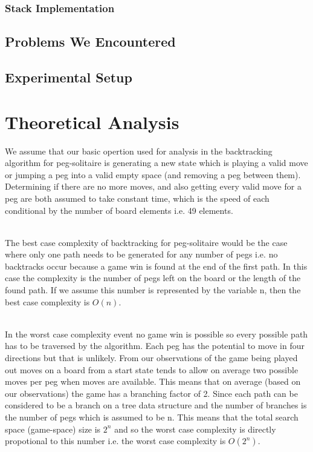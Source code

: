 \documentclass[a4paper]{article}
\begin{document}
\subsubsection{Stack Implementation}


\subsection{Problems We Encountered}

\subsection{Experimental Setup}


\section{Theoretical Analysis}
We assume that our basic opertion used for analysis in the backtracking algorithm for peg-solitaire is generating a new state which is playing a valid move or jumping a peg into a valid empty space (and removing a peg between them). Determining if there are no more moves, and also getting every valid move for a peg are both assumed to take constant time, which is the speed of each conditional by the number of board elements i.e. 49 elements.\\\

\noindent The best case complexity of backtracking for peg-solitaire would be the case where only one path needs to be generated for any number of pegs i.e. no backtracks occur because a game win is found at the end of the first path. In this case the complexity is the number of pegs left on the board or the length of the found path. If we assume this number is represented by the variable n, then the best case complexity is $O(n)$.\\\


\noindent In the worst case complexity event no game win is possible so every possible path has to be traversed by the algorithm. Each peg has the potential to move in four directions but that is unlikely. From our observations of the game being played out moves on a board from a start state tends to allow on average two possible moves per peg when moves are available. This means that on average (based on our observations) the game has a branching factor of 2. Since each path can be considered to be a branch on a tree data structure and the number of branches is the number of pegs which is assumed to be n. This means that the total search space (game-space) size is $2^n$ and so the worst case complexity is directly propotional to this number i.e. the worst case complexity is $O(2^n)$. 
\end{document}
